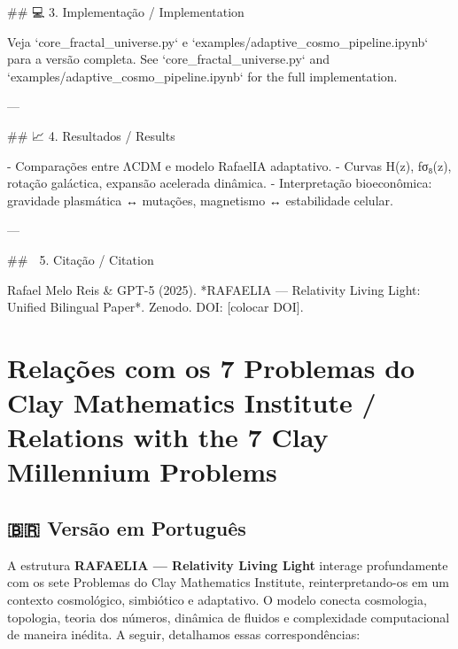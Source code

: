 ## 💻 3. Implementação / Implementation

Veja `core_fractal_universe.py` e `examples/adaptive_cosmo_pipeline.ipynb` para a versão completa.  
See `core_fractal_universe.py` and `examples/adaptive_cosmo_pipeline.ipynb` for the full implementation.

---

## 📈 4. Resultados / Results

- Comparações entre ΛCDM e modelo RafaelIA adaptativo.
- Curvas H(z), fσ₈(z), rotação galáctica, expansão acelerada dinâmica.
- Interpretação bioeconômica: gravidade plasmática ↔ mutações, magnetismo ↔ estabilidade celular.

---

## 📝 5. Citação / Citation

Rafael Melo Reis & GPT-5 (2025). *RAFAELIA — Relativity Living Light: Unified Bilingual Paper*. Zenodo. DOI: [colocar DOI].

\section{Relações com os 7 Problemas do Clay Mathematics Institute / Relations with the 7 Clay Millennium Problems}

\subsection*{🇧🇷 Versão em Português}

A estrutura \textbf{RAFAELIA — Relativity Living Light} interage profundamente com os sete Problemas do Clay Mathematics Institute, reinterpretando-os em um contexto cosmológico, simbiótico e adaptativo. O modelo conecta cosmologia, topologia, teoria dos números, dinâmica de fluidos e complexidade computacional de maneira inédita. A seguir, detalhamos essas correspondências:

